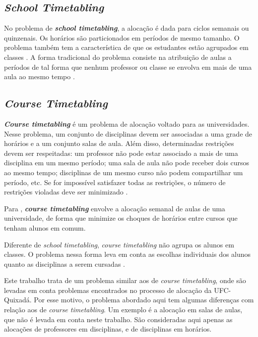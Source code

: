 \subsection{\textit{School Timetabling}}

No problema de \textbf{\textit{school timetabling}}, a alocação é dada para ciclos semanais ou quinzenais. Os horários são particionados em períodos de mesmo tamanho. O problema também tem a característica de que os estudantes estão agrupados em classes \cite{kingston2004tiling}. A forma tradicional do problema consiste na atribuição de aulas a períodos de tal forma que nenhum professor ou classe se envolva em mais de uma aula ao mesmo tempo \cite{vslechta2004decomposition}. 

\subsection{\textit{Course Timetabling}}

\textbf{\textit{Course timetabling}} é um problema de alocação voltado para as universidades. Nesse problema, um conjunto de disciplinas devem ser associadas a uma grade de horários e a um conjunto salas de aula. Além disso, determinadas restrições devem ser respeitadas: um professor não pode estar associado a mais de uma disciplina em um mesmo período; uma sala de aula não pode receber dois cursos ao mesmo tempo; disciplinas de um mesmo curso não podem compartilhar um período, etc. Se for impossível satisfazer todas as restrições, o número de restrições violadas deve ser minimizado \cite{lach2012curriculum}.

Para , \textit{\textbf{course timetabling}} envolve a alocação semanal de aulas de uma universidade, de forma que minimize os choques de horários entre cursos que tenham alunos em comum.

Diferente de \textit{school timetabling}, \textit{course timetabling} não agrupa os alunos em classes. O problema nessa forma leva em conta as escolhas individuais dos alunos quanto as disciplinas a serem cursadas \cite{kingston2004tiling}.

Este trabalho trata de um problema similar aos de \textit{course timetabling}, onde são levadas em conta problemas encontrados no processo de alocação da UFC-Quixadá. Por esse motivo, o problema abordado aqui tem algumas diferenças com relação aos de \textit{course timetabling}. Um exemplo é a alocação em salas de aulas, que não é levada em conta neste trabalho. São consideradas aqui apenas as alocações de professores em disciplinas, e de disciplinas em horários. 

